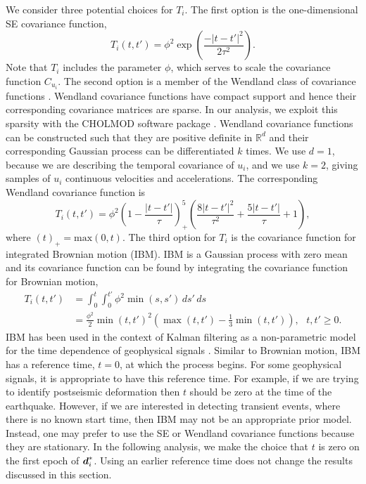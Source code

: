 \documentclass[extra,mreferee]{gji}
\begin{document}

We consider three potential choices for $T_i$. The first option is the
one-dimensional SE covariance function,
\begin{equation}\label{eq:TimeSE}
T_i(t,t') = \phi^2\exp\left(\frac{-|t - t'|^2}{2\tau^2}\right).
\end{equation}
Note that $T_i$ includes the parameter $\phi$, which serves to scale
the covariance function $C_{u_i}$. The second option is a member of
the Wendland class of covariance functions \citep{Wendland2005}.
Wendland covariance functions have compact support and hence their
corresponding covariance matrices are sparse. In our analysis, we
exploit this sparsity with the CHOLMOD software package
\citep{Chen2008}. Wendland covariance functions can be constructed
such that they are positive definite in $\mathbb{R}^d$ and their
corresponding Gaussian process can be differentiated $k$ times. We use
$d=1$, because we are describing the temporal covariance of $u_i$, and
we use $k=2$, giving samples of $u_i$ continuous velocities and
accelerations. The corresponding Wendland covariance function is
\begin{equation}\label{eq:Wendland} 
T_i(t,t') = \phi^2\left(1 - \frac{|t - t'|}{\tau}\right)^5_+ 
            \left(\frac{8|t - t'|^2}{\tau^2} + \frac{5|t - t'|}{\tau} + 1\right), 
\end{equation} 
where $(t)_+ = \mathrm{max}(0,t)$. The third option for $T_i$ is the
covariance function for integrated Brownian motion (IBM). IBM is a
Gaussian process with zero mean and its covariance function can be
found by integrating the covariance function for Brownian motion,
\begin{align}\label{eq:IBM}
T_i(t,t') &= \int_0^t \int_0^{t'} \phi^2 \min(s,s') \,ds'\,ds \\
          &= \frac{\phi^2}{2}\min(t,t')^2 \left(\max(t,t') - \frac{1}{3}\min(t,t')\right), \ \ \ t,t' \geq 0.
\end{align}
IBM has been used in the context of Kalman filtering as a
non-parametric model for the time dependence of geophysical signals
\citep[e.g.,][]{Segall1997, McGuire2003, Ohtani2010, Hines2016a}.
Similar to Brownian motion, IBM has a reference time, $t=0$, at which
the process begins. For some geophysical signals, it is appropriate to
have this reference time. For example, if we are trying to identify
postseismic deformation then $t$ should be zero at the time of the
earthquake.  However, if we are interested in detecting transient
events, where there is no known start time, then IBM may not be an
appropriate prior model. Instead, one may prefer to use the SE or
Wendland covariance functions because they are stationary. In the
following analysis, we make the choice that $t$ is zero on the first
epoch of $\data_i^*$. Using an earlier reference time does not change
the results discussed in this section.
\end{document}
